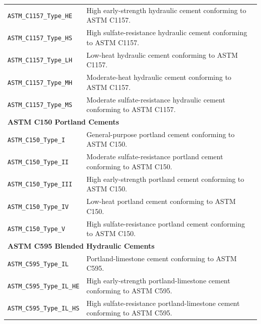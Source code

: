 \documentclass[11pt]{book}
\begin{document}
{\begin{longtable}{p{}p{}}
\texttt{ASTM\_C1157\_Type\_HE} &
High early-strength hydraulic cement conforming to ASTM C1157. \\

\texttt{ASTM\_C1157\_Type\_HS} &
High sulfate-resistance hydraulic cement conforming to ASTM C1157. \\

\texttt{ASTM\_C1157\_Type\_LH} &
Low-heat hydraulic cement conforming to ASTM C1157. \\

\texttt{ASTM\_C1157\_Type\_MH} &
Moderate-heat hydraulic cement conforming to ASTM C1157. \\

\texttt{ASTM\_C1157\_Type\_MS} &
Moderate sulfate-resistance hydraulic cement conforming to ASTM C1157. \\

\hline
\multicolumn{2}{l}{\textbf{ASTM C150 Portland Cements}}\\
\hline

\texttt{ASTM\_C150\_Type\_I} &
General-purpose portland cement conforming to ASTM C150. \\

\texttt{ASTM\_C150\_Type\_II} &
Moderate sulfate-resistance portland cement conforming to ASTM C150. \\

\texttt{ASTM\_C150\_Type\_III} &
High early-strength portland cement conforming to ASTM C150. \\

\texttt{ASTM\_C150\_Type\_IV} &
Low-heat portland cement conforming to ASTM C150. \\

\texttt{ASTM\_C150\_Type\_V} &
High sulfate-resistance portland cement conforming to ASTM C150. \\

\hline
\multicolumn{2}{l}{\textbf{ASTM C595 Blended Hydraulic Cements}}\\
\hline

\texttt{ASTM\_C595\_Type\_IL} &
Portland-limestone cement conforming to ASTM C595. \\

\texttt{ASTM\_C595\_Type\_IL\_HE} &
High early-strength portland-limestone cement conforming to ASTM C595. \\

\texttt{ASTM\_C595\_Type\_IL\_HS} &
High sulfate-resistance portland-limestone cement conforming to ASTM C595. \\


\end{longtable}}
\end{document}
